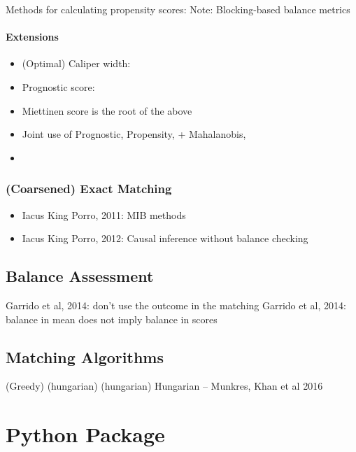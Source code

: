 \documentclass[11pt]{extarticle}
\begin{document}
Methods for calculating propensity scores: \cite{garrido_methods_2014}
Note: Blocking-based balance metrics

\paragraph{Extensions}
\begin{itemize}
  \item (Optimal) Caliper width: \cite{austin_optimal_2011}
  \item Prognostic score: \cite{hansen_prognostic_2008}
  \item Miettinen score is the root of the above \cite{miettinen_stratification_1976}
  \item Joint use of Prognostic, Propensity, + Mahalanobis, \cite{leacy_joint_2014}
  \item \cite{imai_causal_2004}
\end{itemize}

\subsubsection{(Coarsened) Exact Matching}

\begin{itemize}
  \item Iacus King Porro, 2011: MIB methods
  \item Iacus King Porro, 2012: Causal inference without balance checking
\end{itemize}

\subsection{Balance Assessment}

Garrido et al, 2014: don't use the outcome in the matching
Garrido et al, 2014: balance in mean does not imply balance in scores

\subsection{Matching Algorithms}

\parencite{rosenbaum_optimal_1989}
\parencite{ho_matchit_2011} (Greedy)
\parencite{khan_efficient_2016} (hungarian)
\parencite{munkres_algorithms_1957} (hungarian)
Hungarian -- Munkres, Khan et al 2016

\section{Python Package}
\end{document}

